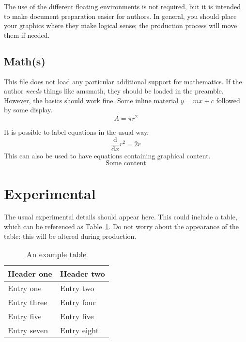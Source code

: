 \documentclass[a4paper]{article}
\begin{document}
The use of the different floating environments is not required, but
it is intended to make document preparation easier for authors. In
general, you should place your graphics where they make logical
sense; the production process will move them if needed.

\subsection{Math(s)}

This file does not load any particular additional support for
mathematics.  If the author \emph{needs} things like
\textsf{amsmath}, they should be loaded in the preamble.  However,
the basics should work fine.  Some inline material $ y = mx + c$
followed by some display. \[ A = \pi r^2 \]

It is possible to label equations in the usual way.
\begin{equation}
  \frac{\mathrm{d}}{\mathrm{d}x} r^2 = 2r
\end{equation}
This can also be used to have equations containing graphical
content.
\begin{equation}
  \textrm{Some content}
  \label{eqn:graphic}
\end{equation}

\section{Experimental}

The usual experimental details should appear here.  This could
include a table, which can be referenced as Table~\ref{tbl:example}.
Do not worry about the appearance of the table: this will be altered
during production.
\begin{table}
  \centering
  \caption{An example table}
  \label{tbl:example}
  \begin{tabular}{ll}
    \hline
    Header one & Header two \\
    \hline
    Entry one & Entry two \\
    Entry three & Entry four \\
    Entry five & Entry five \\
    Entry seven & Entry eight \\
    \hline
  \end{tabular}
\end{table}
\end{document}
